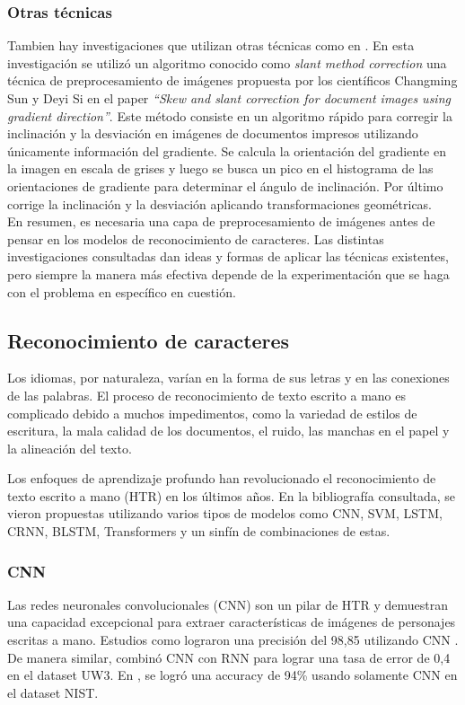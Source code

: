 \documentclass{article}
\begin{document}
\subsubsection{Otras técnicas} 
Tambien hay investigaciones que utilizan otras técnicas como en \cite{5}. En esta investigación se utilizó un algoritmo conocido como \emph{slant method correction} una técnica de preprocesamiento de imágenes propuesta por los científicos Changming Sun y Deyi Si en el paper \emph{“Skew and slant correction for document images using gradient direction”}\cite{6}. Este método consiste en un algoritmo rápido para corregir la inclinación y la desviación en imágenes de documentos impresos utilizando únicamente información del gradiente. Se calcula la orientación del gradiente en la imagen en escala de grises y luego se busca un pico en el histograma de las orientaciones de gradiente para determinar el ángulo de inclinación. Por último corrige la inclinación y la desviación aplicando transformaciones geométricas.
\\[10pt]

En resumen, es necesaria una capa de preprocesamiento de imágenes antes de pensar en los modelos de reconocimiento de caracteres. Las distintas investigaciones consultadas dan ideas y formas de aplicar las técnicas existentes, pero siempre la manera más efectiva depende de la experimentación que se haga con el problema en específico en cuestión.

\newpage

\subsection{Reconocimiento de caracteres}

Los idiomas, por naturaleza, varían en la forma de sus letras y en las conexiones de las palabras. El proceso de reconocimiento de texto escrito a mano es complicado debido a muchos impedimentos, como la variedad de estilos de escritura, la mala calidad de los documentos, el ruido, las manchas en el papel y la alineación del texto. 

Los enfoques de aprendizaje profundo han revolucionado el reconocimiento de texto escrito a mano (HTR) en los últimos años. En la bibliografía consultada, se vieron propuestas utilizando varios tipos de modelos como CNN, SVM, LSTM, CRNN, BLSTM, Transformers y un sinfín de combinaciones de estas. 

\subsubsection{CNN}
 Las redes neuronales convolucionales (CNN) son un pilar de HTR y demuestran una capacidad excepcional para extraer características de imágenes de personajes escritas a mano. Estudios como \cite{7} lograron una precisión del 98,85 utilizando CNN . De manera similar, \cite{8} combinó CNN con RNN para lograr una tasa de error de 0,4 en el dataset UW3. En \cite{2}, se logró una accuracy de 94\% usando solamente CNN en el dataset NIST. 
\end{document}
